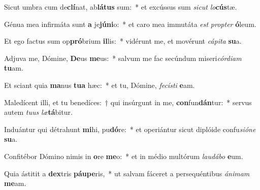 \item Sicut umbra cum de\textbf{clí}nat, ab\textbf{lá}\textbf{tus} sum:~* et excússus sum \textit{sic}\textit{ut} \textit{lo}\textbf{cús}tæ.
\item Génua mea infirmáta sunt \textbf{a} je\textbf{jú}\textbf{ni}o:~* et caro mea immutáta \textit{est} \textit{prop}\textit{ter} \textbf{ó}leum.
\item Et ego factus sum op\textbf{pró}brium \textbf{il}lis:~* vidérunt me, et movérunt \textit{cá}\textit{pi}\textit{ta} \textbf{su}a.
\item Adjuva me, Dómine, \textbf{De}us \textbf{me}us:~* salvum me fac secúndum miseri\textit{cór}\textit{di}\textit{am} \textbf{tu}am.
\item Et sciant quia \textbf{ma}nus \textbf{tu}\textbf{a} hæc:~* et tu, Dómine, \textit{fe}\textit{cís}\textit{ti} \textbf{e}am.
\item Maledícent illi, et tu benedíces:~† qui insúrgunt in me, \textbf{con}fun\textbf{dán}tur:~* servus autem \textit{tu}\textit{us} \textit{læ}\textbf{tá}bitur.
\item Induántur qui détrahunt \textbf{mi}hi, pu\textbf{dó}re:~* et operiántur sicut diplóide confu\textit{si}\textit{ó}\textit{ne} \textbf{su}a.
\item Confitébor Dómino nimis in \textbf{o}re \textbf{me}o:~* et in médio multórum \textit{lau}\textit{dá}\textit{bo} \textbf{e}um.
\item Quia ástitit a \textbf{dex}tris \textbf{páu}\textbf{pe}ris,~* ut salvam fáceret a persequéntibus \textit{á}\textit{ni}\textit{mam} \textbf{me}am.
